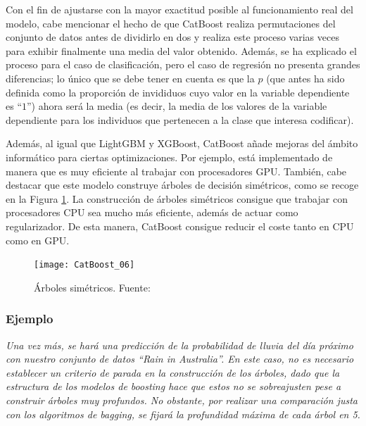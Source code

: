 \documentclass[12pt,twoside]{article}
\begin{document}
Con el fin de ajustarse con la mayor exactitud posible al funcionamiento real del modelo, cabe mencionar el hecho de que CatBoost realiza permutaciones del conjunto de datos antes de dividirlo en dos y realiza este proceso varias veces para exhibir finalmente una media del valor obtenido. Además, se ha explicado el proceso para el caso de clasificación, pero el caso de regresión no presenta grandes diferencias; lo único que se debe tener en cuenta es que la $p$ (que antes ha sido definida como la proporción de invididuos cuyo valor en la variable dependiente es ``$1$'') ahora será la media (es decir, la media de los valores de la variable dependiente para los individuos que pertenecen a la clase que interesa codificar).


Además, al igual que LightGBM y XGBoost, CatBoost añade mejoras del ámbito informático para ciertas optimizaciones. Por ejemplo, está implementado de manera que es muy eficiente al trabajar con procesadores GPU. También, cabe destacar que este modelo construye árboles de decisión simétricos, como se recoge en la Figura \ref{fig:CatB_01}. La construcción de árboles simétricos consigue que trabajar con procesadores CPU sea mucho más eficiente, además de actuar como regularizador. De esta manera, CatBoost consigue reducir el coste tanto en CPU como en GPU.
\begin{figure}[h]
\centering
\texttt{[image: CatBoost\_06]}
\caption{Árboles simétricos. Fuente: \cite{SE01}}
\label{fig:CatB_01}
\end{figure}




\subsubsection{Ejemplo} \label{ex:Boost}

\emph{Una vez más, se hará una predicción de la probabilidad de lluvia del día próximo con nuestro conjunto de datos ``Rain in Australia''. En este caso, no es necesario establecer un criterio de parada en la construcción de los árboles, dado que la estructura de los modelos de boosting hace que estos no se sobreajusten pese a construir árboles muy profundos. No obstante, por realizar una comparación justa con los algoritmos de bagging, se fijará la profundidad máxima de cada árbol en 5.}
\end{document}
